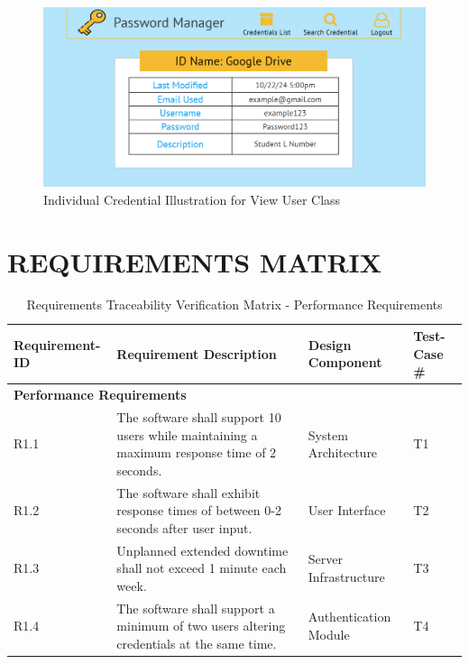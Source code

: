 \documentclass[letterpaper,12pt,oneside,listof=totoc]{scrreprt}
\begin{document}
\begin{figure}
\centering
\includegraphics[width=\linewidth]{UI_Credential_VO.png}
\caption{Individual Credential Illustration for View User Class}
\label{IndivCred_VU}
\end{figure}

\chapter{REQUIREMENTS MATRIX} %

\begin{table}[h]
\centering
\begin{tabularx}{\textwidth}{|l|X|X|l|}
\hline
\textbf{Requirement-ID} & \textbf{Requirement Description} & \textbf{Design Component} & \textbf{Test-Case \#} \\
\hline
\multicolumn{4}{|l|}{\textbf{Performance Requirements}} \\
\hline
R1.1 & The software shall support 10 users while maintaining a maximum response time of 2 seconds. & System Architecture & T1 \\
\hline
R1.2 & The software shall exhibit response times of between 0-2 seconds after user input. & User Interface & T2 \\
\hline
R1.3 & Unplanned extended downtime shall not exceed 1 minute each week. & Server Infrastructure & T3 \\
\hline
R1.4 & The software shall support a minimum of two users altering credentials at the same time. & Authentication Module & T4 \\
\hline
\end{tabularx}
\caption{Requirements Traceability Verification Matrix - Performance Requirements}
\label{tab:RTVM1}
\end{table}
\end{document}
